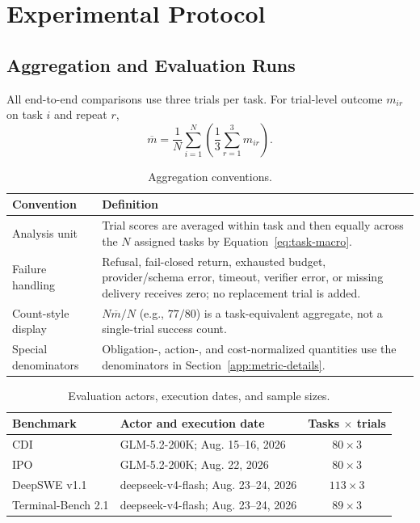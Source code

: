 \section{Experimental Protocol}
\label{app:experimental-protocol}
\subsection{Aggregation and Evaluation Runs}
All end-to-end comparisons use three trials per task. For trial-level outcome $m_{ir}$ on task $i$ and repeat $r$,
\begin{equation}
\overline m=\frac{1}{N}\sum_{i=1}^{N}\left(\frac{1}{3}\sum_{r=1}^{3}m_{ir}\right).
\label{eq:task-macro}
\end{equation}
\begin{table}[H]
\centering
\normalsize
\renewcommand{\arraystretch}{1.14}
\caption{Aggregation conventions.}
\begin{tabularx}{0.90\textwidth}{@{}p{} X@{}}
\toprule
\textbf{Convention} & \textbf{Definition} \\
\midrule
Analysis unit & Trial scores are averaged within task and then equally across the $N$ assigned tasks by Equation~\eqref{eq:task-macro}. \\
Failure handling & Refusal, fail-closed return, exhausted budget, provider/schema error, timeout, verifier error, or missing delivery receives zero; no replacement trial is added. \\
Count-style display & $N\overline m/N$ (e.g., $77/80$) is a task-equivalent aggregate, not a single-trial success count. \\
Special denominators & Obligation-, action-, and cost-normalized quantities use the denominators in Section~\ref{app:metric-details}. \\
\bottomrule
\end{tabularx}
\end{table}
\begin{table}[H]
\centering
\normalsize
\renewcommand{\arraystretch}{1.14}
\setlength{\tabcolsep}{5pt}
\caption{Evaluation actors, execution dates, and sample sizes.}
\label{tab:appendix-eval-overview}
\begin{tabularx}{0.88\textwidth}{@{}l X c@{}}
\toprule
\textbf{Benchmark} & \textbf{Actor and execution date} & \textbf{Tasks $\times$ trials} \\
\midrule
CDI & GLM-5.2-200K; Aug. 15--16, 2026 & $80\times3$ \\
IPO & GLM-5.2-200K; Aug. 22, 2026 & $80\times3$ \\
DeepSWE v1.1 & deepseek-v4-flash; Aug. 23--24, 2026 & $113\times3$ \\
Terminal-Bench 2.1 & deepseek-v4-flash; Aug. 23--24, 2026 & $89\times3$ \\
\bottomrule
\end{tabularx}
\end{table}
